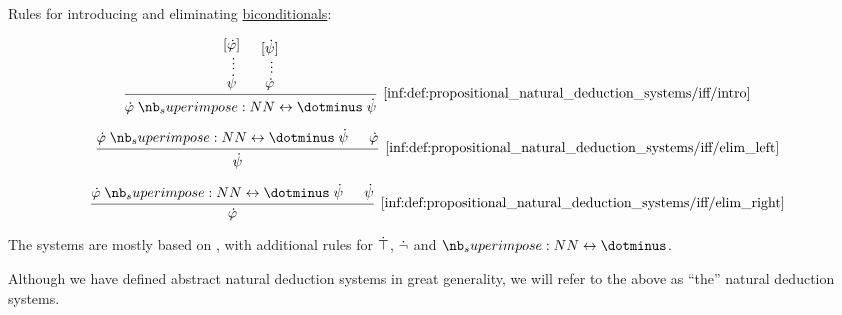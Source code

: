 \begin{definition}
\begin{thmenum}
    \mimprovised Rules for introducing and eliminating \hyperref[def:propositional_alphabet/connectives/biconditional]{biconditionals}:
    \begin{paracol}{3}
      \begin{leftcolumn}
        \leavevmode\vfill
        \begin{equation*}\taglabel[\ensuremath{ \leftrightarrow^+ }]{inf:def:propositional_natural_deduction_systems/iff/intro}
          \begin{prooftree}
            \hypo{ [\syn\varphi] }
            \ellipsis {} { \syn\psi }
            \hypo{ [\syn\psi] }
            \ellipsis {} { \syn\varphi }
            \infer2[\ref{inf:def:propositional_natural_deduction_systems/iff/intro}]{ \syn\varphi \syniff \syn\psi }
          \end{prooftree}
        \end{equation*}
      \end{leftcolumn}

      \begin{nthcolumn}{1}
        \leavevmode\vfill
        \begin{equation*}\taglabel[\ensuremath{ \leftrightarrow^{-_L} }]{inf:def:propositional_natural_deduction_systems/iff/elim_left}
          \begin{prooftree}
            \hypo{ \syn\varphi \syniff \syn\psi }
            \hypo{ \syn\varphi }
            \infer2[\ref{inf:def:propositional_natural_deduction_systems/iff/elim_left}]{ \syn\psi }
          \end{prooftree}
        \end{equation*}
      \end{nthcolumn}

      \begin{nthcolumn}{2}
        \leavevmode\vfill
        \begin{equation*}\taglabel[\ensuremath{ \leftrightarrow^{-_R} }]{inf:def:propositional_natural_deduction_systems/iff/elim_right}
          \begin{prooftree}
            \hypo{ \syn\varphi \syniff \syn\psi }
            \hypo{ \syn\psi }
            \infer2[\ref{inf:def:propositional_natural_deduction_systems/iff/elim_right}]{ \syn\varphi }
          \end{prooftree}
        \end{equation*}
      \end{nthcolumn}
    \end{paracol}
  \end{thmenum}
\end{definition}
\begin{comments}
  \item The systems are mostly based on \cite[def. 2.1.1]{TroelstraSchwichtenberg2000Proofs}, with additional rules for \( \dot\top \), \( \dot\neg \) and \( \syniff \).
  \item Although we have defined abstract natural deduction systems in great generality, we will refer to the above as \enquote{the} natural deduction systems.
\end{comments}

